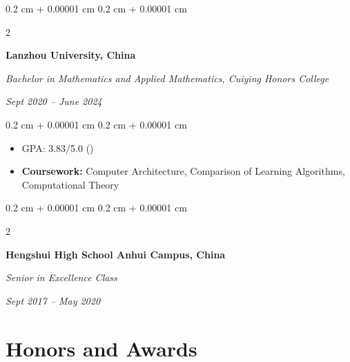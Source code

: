 \documentclass[10pt, letterpaper]{article}
\newenvironment{highlights}{
    \begin{itemize}[
        topsep=0.10 cm,
        parsep=0.10 cm,
        partopsep=0pt,
        itemsep=0pt,
        leftmargin=0.4 cm + 10pt
    ]
}{
    \end{itemize}
} %
\newenvironment{onecolentry}{
    \begin{adjustwidth}{
        0.2 cm + 0.00001 cm
    }{
        0.2 cm + 0.00001 cm
    }
}{
    \end{adjustwidth}
} %
\newenvironment{twocolentry}[2][]{
    \onecolentry
    \def\secondColumn{#2}
    \setcolumnwidth{\fill, 5.5 cm}
    \begin{paracol}{2}
}{
    \switchcolumn \raggedleft \secondColumn
    \end{paracol}
    \endonecolentry
} %
\let\hrefWithoutArrow\href
\renewcommand{\href}[2]{\hrefWithoutArrow{#1}{\ifthenelse{\equal{#2}{}}{ }{#2 }\raisebox{.15ex}{\footnotesize \faExternalLink*}}}
\begin{document}
    \vspace{0.10 cm}


        
    \begin{twocolentry}{
        
        \textit{Sept 2020 – June 2024}}
            \textbf{Lanzhou University, China}
    
            \textit{Bachelor in Mathematics and Applied Mathematics, Cuiying Honors College}
    \end{twocolentry}
    \begin{onecolentry}
        \begin{highlights}
            \item GPA: 3.83/5.0 (\href{https://zhoufy20.github.io/files/cv/cv.pdf}{pdf})
            \item \textbf{Coursework:} Computer Architecture, Comparison of Learning Algorithms, Computational Theory
        \end{highlights}
    \end{onecolentry}
    \vspace{0.10 cm}

    \begin{twocolentry}{
        
        \textit{Sept 2017 – May 2020}}
            \textbf{Hengshui High School Anhui Campus, China}
    
            \textit{Senior in Excellence Class}
    \end{twocolentry}

    
    \section{Honors and Awards}
\end{document}

